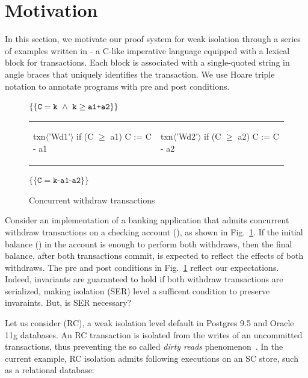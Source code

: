 \section{Motivation}

In this section, we motivate our proof system for weak isolation
through a series of examples written in \txnimp - a C-like imperative
language equipped with a  lexical block for transactions. Each
 block is associated with a single-quoted string in angle
braces that uniquely identifies the transaction. We use Hoare triple
notation to annotate programs with pre and post conditions.

\begin{figure}
\centering
$\{\{\texttt{C}=\texttt{k} ~\wedge~ \texttt{k}\ge\texttt{a1+a2}\}\}$
\begin{tabular}{l||l}
\begin{txnimpcode}
  txn$\langle$'Wd1'$\rangle${
    if (C $\ge$ a1) {
      C := C - a1
    }
  }
\end{txnimpcode}
&
\begin{txnimpcode}
  txn$\langle$'Wd2'$\rangle${
    if (C $\ge$ a2) {
      C := C - a2
    }
  }
\end{txnimpcode}
\\
\end{tabular}
$\{\{\texttt{C}=\texttt{k-a1-a2}\}\}$

\caption{Concurrent withdraw transactions}
\label{fig:motiv-eg-1}
\end{figure}

Consider an implementation of a banking application that admits
concurrent withdraw transactions on a checking account (), as
shown in Fig.~\ref{fig:motiv-eg-1}. If the initial balance () in
the account is enough to perform both withdraws, then the final
balance, after both transactions commit, is expected to reflect the
effects of both withdraws. The pre and post conditions in
Fig.~\ref{fig:motiv-eg-1} reflect our expectations. Indeed, invariants
are guaranteed to hold if both withdraw transactions are serialized,
making  isolation (SER) level a sufficent condition
to preserve invaraints. But, is SER necessary?

Let us consider  (RC), a weak isolation level
default in Postgres 9.5 and Oracle 11g databases. An RC transaction is
isolated from the writes of an uncommitted transactions, thus
preventing the so called \emph{dirty reads}
phenomenon~\cite{berenson}. In the current example, RC isolation
admits following executions on an SC store, such as a relational
database:

